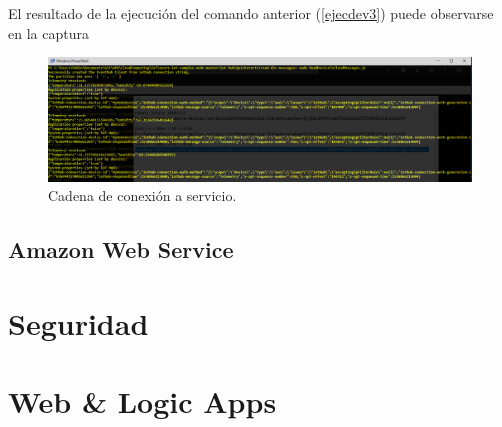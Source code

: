 \documentclass[10pt]{article}
\begin{document}
El resultado de la ejecución del comando anterior
(\hyperref[ejecdev3]{\ref{ejecdev3}}) puede observarse en la captura 

\begin{figure}[h!]
 \includegraphics[width=\linewidth]{./IoT/MicrosoftAzure/5-4_read_telemetry.png}
 \caption{Cadena de conexión a servicio.}
 \label{nodeser}
\end{figure}

\subsection*{Amazon Web Service}

\section{Seguridad}

\section{Web \& Logic Apps}
\end{document}
